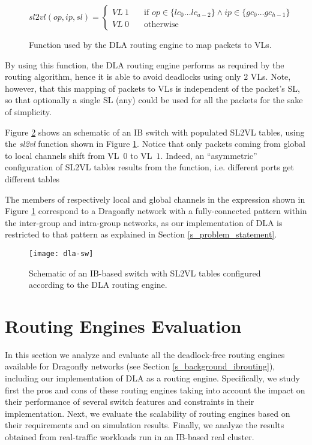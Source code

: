 \documentclass[review]{elsarticle}
\newcommand{\dfly}{Dragonfly}
\newcommand{\ib}{IB}
\begin{document}
\begin{figure}[!htb]
	\centering
    \[ sl2vl(op, ip, sl) =
      \begin{cases}
        VL~1       & \quad \text{if } op \in \{lc_0 \dots lc_{a-2}\} \land ip \in \{gc_0 \dots gc_{h-1}\}\\
        VL~0       & \quad \text{otherwise}
      \end{cases}
    \]
	\caption{Function used by the DLA routing engine to map packets to VLs.}
	\label{f:sl2vl_function}
\end{figure}

By using this function, the DLA routing engine performs as required by the routing algorithm, hence it is able to avoid deadlocks using only $2$ VLs. Note, however, that this mapping of packets to VLs is independent of the packet's SL, so that optionally a single SL (any) could be used for all the packets for the sake of simplicity.

Figure \ref{f:sw_sl2vl} shows an schematic of an \ib{} switch with populated SL2VL tables, using the \emph{sl2vl} function shown in Figure \ref{f:sl2vl_function}.
Notice that only packets coming from global to local channels shift from VL~$0$ to VL~$1$. Indeed, an ``asymmetric'' configuration of SL2VL tables results from the function, i.e. different ports get different tables

The members of respectively local and global channels in the expression shown in Figure \ref{f:sl2vl_function} correspond to a
\dfly{} network with a fully-connected pattern within the inter-group and intra-group networks,
as our implementation of DLA is restricted to that pattern as explained in Section \ref{s_problem_statement}.


\begin{figure}[!htb]
	\centering
	\texttt{[image: dla-sw]}
	\caption{Schematic of an \ib-based switch with SL2VL tables configured according to the DLA routing engine.}
	\label{f:sw_sl2vl}
\end{figure}

\section{Routing Engines Evaluation}
\label{s_evaluation}

In this section we analyze and evaluate all the deadlock-free routing engines available for \dfly{} networks (see Section \ref{s_background_ibrouting}),
including our implementation of DLA as a routing engine.
Specifically, we study first the pros and cons of these routing engines taking into account the impact on their performance of several
switch features and constraints in their implementation.
Next, we evaluate the scalability of routing engines based on their requirements and on simulation results.
Finally, we analyze the results obtained from real-traffic workloads run in an \ib-based real cluster.
\end{document}
